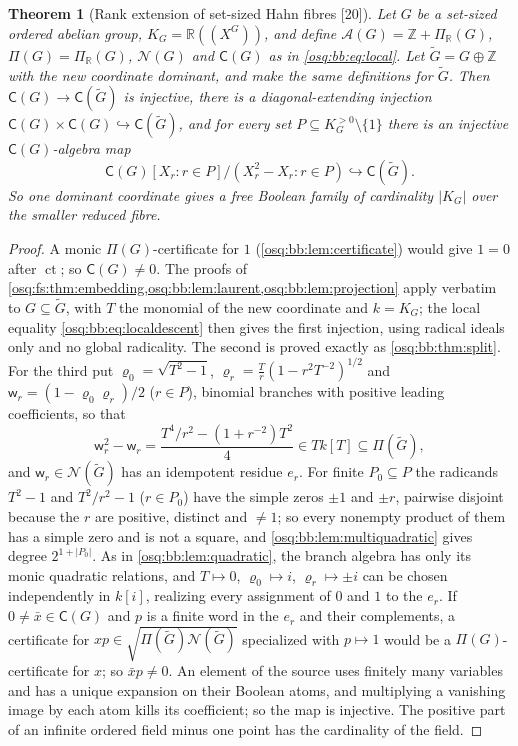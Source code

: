 \documentclass[11pt,letterpaper]{article}
\numberwithin{equation}{section}
\newtheorem{theorem}{Theorem}[section]
\theoremstyle{definition}
\theoremstyle{remark}
\theoremstyle{plain}
\newcommand{\Z}{\mathbb Z}
\newcommand{\R}{\mathbb R}
\newcommand{\A}{\mathcal A}          %
\newcommand{\NN}{\mathcal N}         %
\newcommand{\hahn}[2]{#1(\!(X^{#2})\!)}
\newcommand{\ct}{\operatorname{ct}}
\newcommand{\src}[1]{\textup{\textsf{[#1]}}}
\begin{document}
\begin{theorem}[Rank extension of set-sized Hahn fibres \src{20}]\label{osq:bb:thm:rank}
Let $G$ be a set-sized ordered abelian group, $K_G=\hahn\R G$, and define $\A(G)=\Z+\Pi_\R(G)$, $\Pi(G)=\Pi_\R(G)$, $\NN(G)$ and
$\mathsf C(G)$ as in \eqref{osq:bb:eq:local}. Let $\widetilde G=G\oplus\Z$ with the new coordinate dominant, and make the same
definitions for $\widetilde G$. Then $\mathsf C(G)\to\mathsf C(\widetilde G)$ is injective, there is a diagonal-extending injection
$\mathsf C(G)\times\mathsf C(G)\hookrightarrow\mathsf C(\widetilde G)$, and for every set $P\subseteq K_G^{>0}\setminus\{1\}$ there is an
injective $\mathsf C(G)$-algebra map
\[
 \mathsf C(G)[X_r:r\in P]/(X_r^2-X_r:r\in P)\hookrightarrow\mathsf C(\widetilde G).
\]
So one dominant coordinate gives a free Boolean family of cardinality $|K_G|$ over the smaller reduced fibre.
\end{theorem}
\begin{proof}
A monic $\Pi(G)$-certificate for $1$ (\cref{osq:bb:lem:certificate}) would give $1=0$ after $\ct$; so $\mathsf C(G)\ne0$. The
proofs of \cref{osq:fs:thm:embedding,osq:bb:lem:laurent,osq:bb:lem:projection} apply verbatim to $G\subseteq\widetilde G$, with $T$ the
monomial of the new coordinate and $k=K_G$; the local equality \eqref{osq:bb:eq:localdescent} then gives the first injection, using
radical ideals only and no global radicality. The second is proved exactly as \cref{osq:bb:thm:split}. For the third put
$\varrho_0=\sqrt{T^2-1}$, $\varrho_r=\frac Tr(1-r^2T^{-2})^{1/2}$ and $\mathsf w_r=(1-\varrho_0\varrho_r)/2$ ($r\in P$), binomial branches
with positive leading coefficients, so that
\[
 \mathsf w_r^2-\mathsf w_r=\frac{T^4/r^2-(1+r^{-2})T^2}{4}\in Tk[T]\subseteq\Pi(\widetilde G),
\]
and $\mathsf w_r\in\NN(\widetilde G)$ has an idempotent residue $e_r$. For finite $P_0\subseteq P$ the radicands $T^2-1$ and $T^2/r^2-1$
($r\in P_0$) have the simple zeros $\pm1$ and $\pm r$, pairwise disjoint because the $r$ are positive, distinct and $\ne1$; so every
nonempty product of them has a simple zero and is not a square, and \cref{osq:bb:lem:multiquadratic} gives degree $2^{1+|P_0|}$. As
in \cref{osq:bb:lem:quadratic}, the branch algebra has only its monic quadratic relations, and $T\mapsto0$, $\varrho_0\mapsto i$,
$\varrho_r\mapsto\pm i$ can be chosen independently in $k[i]$, realizing every assignment of $0$ and $1$ to the $e_r$. If $0\ne\bar x\in\mathsf C(G)$
and $p$ is a finite word in the $e_r$ and their complements, a certificate for $xp\in\sqrt{\Pi(\widetilde G)\NN(\widetilde G)}$ specialized with
$p\mapsto1$ would be a $\Pi(G)$-certificate for $x$; so $\bar xp\ne0$. An element of the source uses finitely many variables and
has a unique expansion on their Boolean atoms, and multiplying a vanishing image by each atom kills its coefficient; so the map is
injective. The positive part of an infinite ordered field minus one point has the cardinality of the field.
\end{proof}
\end{document}
